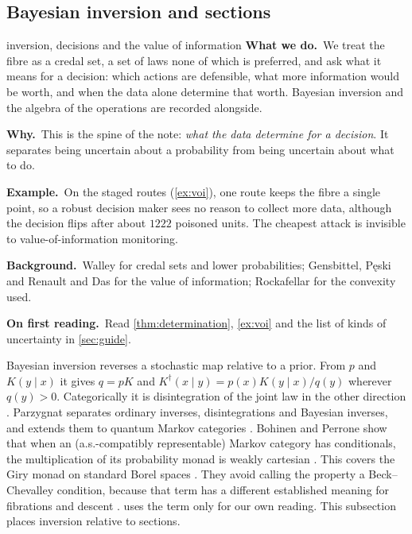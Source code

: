 \documentclass[11pt]{article}
\theoremstyle{definition}\newtheorem{definition}[theorem]{Definition}\newtheorem{remark}[theorem]{Remark}\newtheorem{example}[theorem]{Example}\newtheorem{problem}[theorem]{Open problem}\crefname{problem}{Problem}{Problems}
\newcommand{\Peski}{P{\fontencoding{T1}\selectfont\k{e}}ski}
\newcommand{\rbwhat}{\textcolor{rbWhat}{\textbf{What we do.}}~}\newcommand{\rbwhy}{\par\smallskip\textcolor{rbWhy}{\textbf{Why.}}~}
\newcommand{\rbex}{\par\smallskip\textcolor{rbEx}{\textbf{Example.}}~}\newcommand{\rbbg}{\par\smallskip\textcolor{rbBg}{\textbf{Background.}}~}
\newcommand{\rbfirst}{\par\smallskip\textcolor{rbFirst}{\textbf{On first reading.}}~}
\begin{document}
\subsection{Bayesian inversion and sections}\label{sec:invsec}
\begin{readerbox}{inversion, decisions and the value of information}
\rbwhat We treat the fibre as a credal set, a set of laws none of which is preferred, and ask what it means for a decision: which actions are defensible, what more information would be worth, and when the data alone determine that worth. Bayesian inversion and the algebra of the operations are recorded alongside.
\rbwhy This is the spine of the note: \emph{what the data determine for a decision}. It separates being uncertain about a probability from being uncertain about what to do.
\rbex On the staged routes (\cref{ex:voi}), one route keeps the fibre a single point, so a robust decision maker sees no reason to collect more data, although the decision flips after about $1222$ poisoned units. The cheapest attack is invisible to value-of-information monitoring.
\rbbg Walley \cite{Walley1991} for credal sets and lower probabilities; Gensbittel, \Peski{} and Renault \cite{GensbittelPeskiRenault2022} and Das \cite{Das2023} for the value of information; Rockafellar \cite{Rockafellar1970} for the convexity used.
\rbfirst Read \cref{thm:determination}, \cref{ex:voi} and the list of kinds of uncertainty in \cref{sec:guide}.
\end{readerbox}
Bayesian inversion reverses a stochastic map relative to a prior. From $p$ and $K(y\mid x)$ it gives $q=pK$ and $K^\dagger(x\mid y)=p(x)K(y\mid x)/q(y)$ wherever $q(y)>0$. Categorically it is disintegration of the joint law in the other direction \cite{ChoJacobs2019}. Parzygnat separates ordinary inverses, disintegrations and Bayesian inverses, and extends them to quantum Markov categories \cite{Parzygnat2020}. Bohinen and Perrone show that when an (a.s.-compatibly representable) Markov category has conditionals, the multiplication of its probability monad is weakly cartesian \cite[Thm.~3.1]{BohinenPerrone2025}. This covers the Giry monad on standard Borel spaces \cite[Cors.~3.2, 3.9]{BohinenPerrone2025}. They avoid calling the property a Beck--Chevalley condition, because that term has a different established meaning for fibrations and descent \cite[Rem.~2.25]{BohinenPerrone2025}.  uses the term only for our own reading. This subsection places inversion relative to sections.
\end{document}
